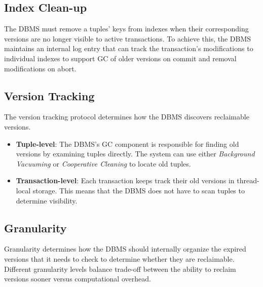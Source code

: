 \documentclass[11pt]{article}
\begin{document}
\subsection*{Index Clean-up}
The DBMS must remove a tuples' keys from indexes when their corresponding versions are no longer 
visible to active transactions. To achieve this, the DBMS maintains an internal log entry that can 
track the transaction's modifications to individual indexes to support GC of older versions on 
commit and removal modifications on abort.

\subsection*{Version Tracking}
The version tracking protocol determines how the DBMS discovers reclaimable versions.

\begin{itemize}
    \item \textbf{Tuple-level}:
    The DBMS's GC component is responsible for finding old versions by examining tuples directly. 
    The system can use either \textit{Background Vacuuming} or \textit{Cooperative Cleaning} to 
    locate old tuples.
    
    \item \textbf{Transaction-level}:
    Each transaction keeps track their old versions in thread-local storage. This means that the 
    DBMS does not have to scan tuples to determine visibility.
\end{itemize}

\subsection*{Granularity}
Granularity determines how the DBMS should internally organize the expired versions that it needs to 
check to determine whether they are reclaimable. Different granularity levels balance trade-off 
between the ability to reclaim versions sooner versus computational overhead.
\end{document}
